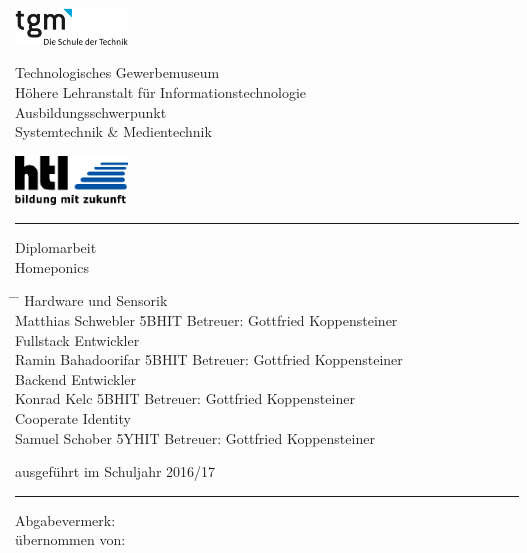 \rmfamily
\noindent
\begin{minipage}[t]{3cm}
	\includegraphics[width=3cm]{images/logo_tgm}
\end{minipage}
\hfill
\begin{minipage}{8cm}
	\centering
	{\Large Technologisches Gewerbemuseum}\\[2ex]
	Höhere Lehranstalt für Informationstechnologie\\
	{\small Ausbildungsschwerpunkt \\ Systemtechnik \& Medientechnik}
\end{minipage}
\hfill
\begin{minipage}[t]{3cm}
	\includegraphics[width=3cm]{images/logo_htl}
\end{minipage}
\vspace*{1em}
\hrule

\vspace{5em}
\begin{center}
	{\Huge Diplomarbeit}\\[2em]
	{\Large Homeponics}	
\end{center}
\vspace{5em}

\begin{tabbing}
	\hspace*{4cm} \= \hspace*{4cm} \= \kill
	{\Large Hardware und Sensorik}\\[7pt]
	Matthias Schwebler \> 5BHIT \> Betreuer: Gottfried Koppensteiner\\[30pt]
	{\Large Fullstack Entwickler}\\[7pt]
	Ramin Bahadoorifar \> 5BHIT \> Betreuer: Gottfried Koppensteiner\\[30pt]
	{\Large Backend Entwickler}\\[7pt]
	Konrad Kelc \> 5BHIT \> Betreuer: Gottfried Koppensteiner\\[30pt]
	{\Large Cooperate Identity}\\[7pt]
	Samuel Schober \> 5YHIT \> Betreuer: Gottfried Koppensteiner
\end{tabbing}

\vfill

ausgeführt im Schuljahr 2016/17\\[1ex]
\hrule
\vspace*{1em}
\noindent
Abgabevermerk:\\
übernommen von:
\rmfamily
